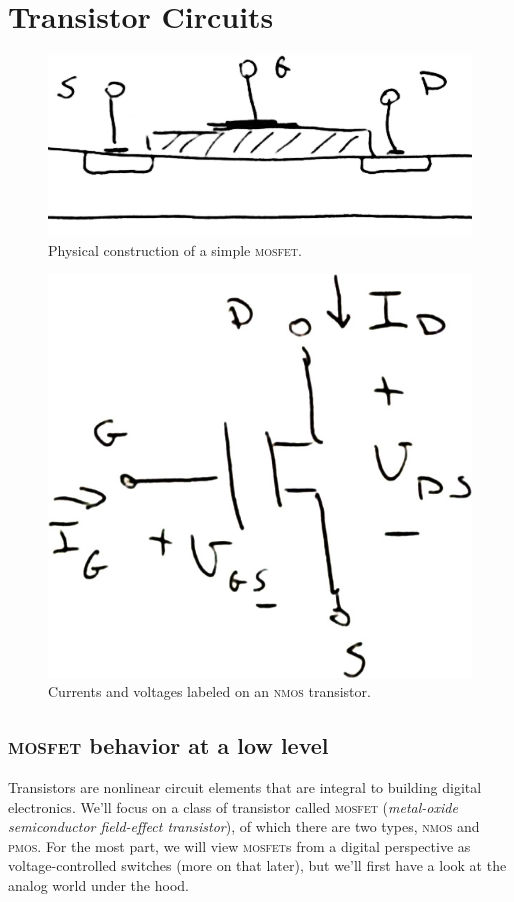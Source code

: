 \chapter{Transistor Circuits}

\begin{figure}
  \centering
  \includegraphics[width=0.75\linewidth]{figures/MOS-physical-sketch}
  \caption{Physical construction of a simple \textsc{mosfet}.}
  \label{figure:lec2-MOS}
\end{figure}

\begin{figure}
  \centering
  \includegraphics[width=0.5\linewidth]{figures/NMOS-currents-voltages}
  \caption{Currents and voltages labeled on an \textsc{nmos} transistor.}
  \label{figure:lec2-NMOS}
\end{figure}

\section{\textsc{mosfet} behavior at a low level}
Transistors are nonlinear circuit elements that are integral to building digital electronics.
We'll focus on a class of transistor called \textsc{mosfet}
(\emph{metal-oxide semiconductor field-effect transistor}),
of which there are two types, \textsc{nmos} and \textsc{pmos}.
For the most part, we will view \textsc{mosfet}s from a digital perspective as voltage-controlled switches (more on that later), but we'll first have a look at the analog
world under the hood.

